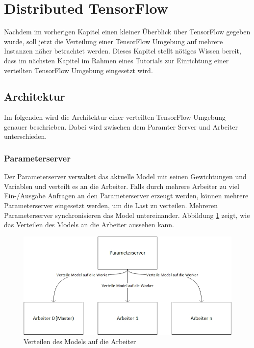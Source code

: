 \section{Distributed TensorFlow}
Nachdem im vorherigen Kapitel einen kleiner Überblick über TensorFlow gegeben wurde, soll jetzt die Verteilung einer TensorFlow Umgebung auf mehrere Instanzen näher betrachtet werden. Dieses Kapitel stellt nötiges Wissen bereit, dass im nächsten Kapitel im Rahmen eines Tutorials zur Einrichtung einer verteilten TensorFlow Umgebung eingesetzt wird. 

\subsection{Architektur}
Im folgenden wird die Architektur einer verteilten TensorFlow Umgebung genauer beschrieben. Dabei wird zwischen dem Paramter Server und Arbeiter unterschieden.

\subsubsection{Parameterserver}
Der Parameterserver verwaltet das aktuelle Model mit seinen Gewichtungen und Variablen und verteilt es an die Arbeiter. Falls durch mehrere Arbeiter zu viel Ein-/Ausgabe Anfragen an den Parameterserver erzeugt werden, können mehrere Parameterserver eingesetzt werden, um die Last zu verteilen. Mehreren Parameterserver synchronisieren das Model untereinander. Abbildung \ref{fig:architektur-servemodel} zeigt, wie das Verteilen des Models an die Arbeiter aussehen kann. 

\begin{figure}[h!]
	\centering
	\includegraphics[width=0.9\linewidth]{Pictures/Architektur-ServeModel}
	\caption[Verteilen des Models auf die Arbeiter]{Verteilen des Models auf die Arbeiter}
	\label{fig:architektur-servemodel}
\end{figure}

